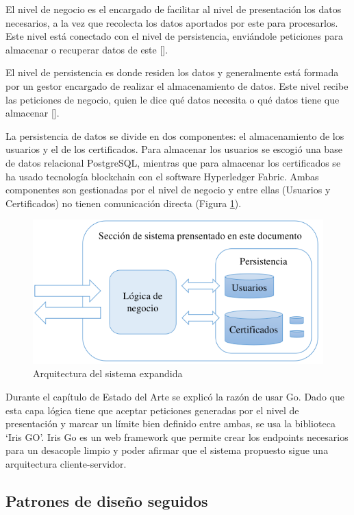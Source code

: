 El nivel de negocio es el encargado de facilitar al nivel de presentación los datos necesarios, a la vez que recolecta los datos aportados por este para procesarlos. Este nivel está conectado con el nivel de persistencia, enviándole peticiones para almacenar o recuperar datos de este [\cite{96}].

El nivel de persistencia es donde residen los datos y generalmente está formada por un gestor encargado de realizar el almacenamiento de datos. Este nivel recibe las peticiones de negocio, quien le dice qué datos necesita o qué datos tiene que almacenar [\cite{96}]. 

La persistencia de datos se divide en dos componentes: el almacenamiento de los usuarios y el de los certificados. Para almacenar los usuarios se escogió una base de datos relacional PostgreSQL, mientras que para almacenar los certificados se ha usado tecnología blockchain con el software Hyperledger Fabric. Ambas componentes son gestionadas por el nivel de negocio y entre ellas (Usuarios y Certificados) no tienen comunicación directa (Figura \ref{fig:9}).

\begin{figure}[h]
	\centering
	\includegraphics[width=\linewidth]{Graphics/arquitectura-ex.png}
	\caption{Arquitectura del sistema expandida}
	\label{fig:9}
\end{figure}

Durante el capítulo de Estado del Arte se explicó la razón de usar Go. Dado que esta capa lógica tiene que aceptar peticiones generadas por el nivel de presentación y marcar un límite bien definido entre ambas, se usa la biblioteca `Iris GO'. Iris Go es un web framework que permite crear los endpoints necesarios para un desacople limpio y poder afirmar que el sistema propuesto sigue una arquitectura cliente-servidor.

\subsection{Patrones de diseño seguidos}

